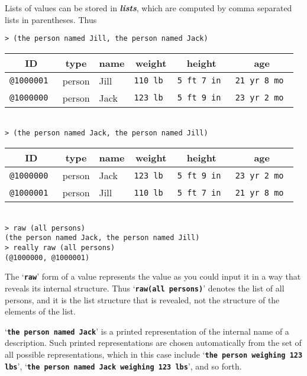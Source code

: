 \documentclass[12pt]{article}
\newcommand{\TT}[1]{{\tt \bfseries #1}}
\newcommand{\skey}[2]{{\bf \em #1#2}\index{#1}}
\newenvironment{indpar}[1][0.3in]%
	{\begin{list}{}%
		     {\setlength{\itemsep}{0in}%
		      \setlength{\topsep}{0in}%
		      \setlength{\parsep}{1ex}%
		      \setlength{\labelwidth}{#1}%
		      \setlength{\leftmargin}{#1}%
		      \addtolength{\leftmargin}{\labelsep}}%
	 \item}%
	{\end{list}}
\begin{document}
Lists of values can be stored in \skey{list}s, which are computed by comma
separated lists in parentheses.  Thus

\begin{indpar}
\verb|> (the person named Jill, the person named Jack)| \\
\begin{tabular}{|r|l|l|r|r|r|}
\hline
\multicolumn{1}{|c}{\bf ID} &
\multicolumn{1}{|c}{\bf type} &
\multicolumn{1}{|c}{\bf name} &
\multicolumn{1}{|c}{\bf weight} &
\multicolumn{1}{|c}{\bf height} &
\multicolumn{1}{|c|}{\bf age} \\
\hline
\tt @1000001 & person & Jill & \tt 110 lb & \tt 5 ft 7 in & \tt 21 yr 8 mo \\
\tt @1000000 & person & Jack & \tt 123 lb & \tt 5 ft 9 in & \tt 23 yr 2 mo \\
\hline
\end{tabular} \\[0.5ex]
\verb|> (the person named Jack, the person named Jill)| \\
\begin{tabular}{|r|l|l|r|r|r|}
\hline
\multicolumn{1}{|c}{\bf ID} &
\multicolumn{1}{|c}{\bf type} &
\multicolumn{1}{|c}{\bf name} &
\multicolumn{1}{|c}{\bf weight} &
\multicolumn{1}{|c}{\bf height} &
\multicolumn{1}{|c|}{\bf age} \\
\hline
\tt @1000000 & person & Jack & \tt 123 lb & \tt 5 ft 9 in & \tt 23 yr 2 mo \\
\tt @1000001 & person & Jill & \tt 110 lb & \tt 5 ft 7 in & \tt 21 yr 8 mo \\
\hline
\end{tabular} \\[0.5ex]
\verb|> raw (all persons)| \\
\verb|(the person named Jack, the person named Jill)| \\
\verb|> really raw (all persons)| \\
\verb|(@1000000, @1000001)|
\end{indpar}

The `\TT{raw}' form of a value represents the value
as you could input it in a way that reveals its internal structure.  Thus
`\TT{raw(all~persons)}' denotes the list of all persons, and it is the list
structure that is revealed, not the structure of the elements of the list.

`\TT{the person named Jack}' is a printed representation of the
internal name of a description.  Such printed representations are chosen
automatically from the set of all possible representations, which
in this case include `\TT{the person weighing 123 lbs}',
`\TT{the person named Jack weighing 123 lbs}', and so forth.
\end{document}
